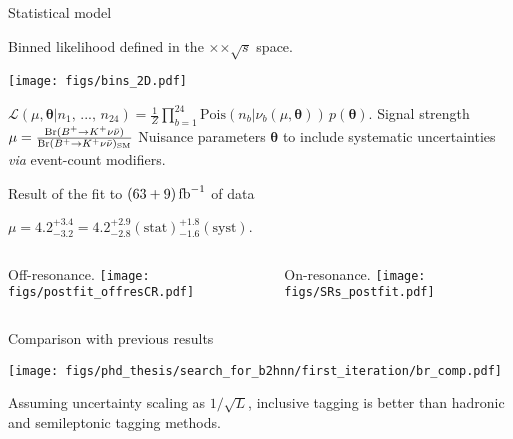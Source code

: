 \begin{frame}{Statistical model}
\bi
\item Binned likelihood defined in the \bdtt$\times$\ptK$\times\sqrt{s}$ space.
\begin{center}
\texttt{[image: figs/bins\_2D.pdf]}
\end{center}
\vspace{-0.2cm}
\item {$
\mathcal{L}(\mu,\boldsymbol{\theta}|n_1,\,...,\,n_{24})=
\frac{1}{Z}
\prod^{24}_{b=1}\mathrm{Pois}(n_b|\nu_b(\mu,\boldsymbol{\theta}))\,
p(\boldsymbol{\theta})
$.}
\bi
{}
\itemiii Signal strength $\mu=\frac{\mathrm{Br}(B^+\rightarrow K^+\nu\bar{\nu})}{\mathrm{Br}(B^+\rightarrow K^+\nu\bar{\nu})_{\mathrm{SM}}}$
\itemiii Nuisance parameters $\boldsymbol{\theta}$ to include systematic uncertainties \textit{via} event-count modifiers.
\ei
\ei
\end{frame}
\begin{frame}{Result of the fit to $(63+9)\mbox{\,fb}^{-1}$ of data}
\bi
\item {\small $\mu = 4.2^{+3.4}_{-3.2} = 4.2^{+2.9}_{-2.8}(\mathrm{stat}){}^{+1.8}_{-1.6}(\mathrm{syst})$.}
\ei
\vspace{0.5cm}
\begin{columns}
\begin{column}{0.5\linewidth}
\bi
\item Off-resonance.
\ei
\centering
\texttt{[image: figs/postfit\_offresCR.pdf]}
\end{column}
\begin{column}{0.5\linewidth}
\bi
\item On-resonance.
\ei
\centering
\texttt{[image: figs/SRs\_postfit.pdf]}
\end{column}
\end{columns}
\end{frame}
\begin{frame}{Comparison with previous results}

\centering
\texttt{[image: figs/phd\_thesis/search\_for\_b2hnn/first\_iteration/br\_comp.pdf]}

\bi
\item Assuming uncertainty scaling as $1/\sqrt{L}$, inclusive tagging is better than hadronic and semileptonic tagging methods.
\ei

\vspace{0.2cm}

\end{frame}
